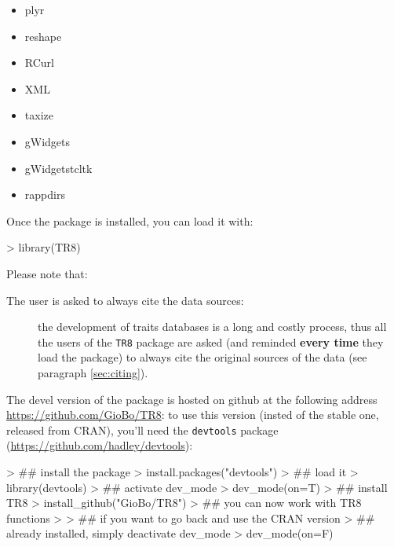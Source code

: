 \documentclass{article}
\begin{document}
 \begin{itemize}
  \item plyr\cite{plyr}
  \item reshape\cite{reshape}
  \item RCurl\cite{RCurl}
  \item XML\cite{XML}
  \item taxize\cite{taxize}
  \item gWidgets\cite{gWidgets}
  \item gWidgetstcltk
  \item rappdirs
  \end{itemize}
  

  
  Once the package is installed, you can load it with:

\begin{Schunk}
\begin{Sinput}
> library(TR8)
\end{Sinput}
\end{Schunk}

Please note that:

\begin{description}
\item[The user is asked to always cite the data sources: ] the
  development of traits databases is a long and costly process,
  thus all the users of the \texttt{TR8} package are asked (and
  reminded \textbf{every time} they load the package) to always cite the original sources of the data (see
  paragraph \ref{sec:citing}).
  
\end{description}

  The devel version of the package is hosted on github at the
  following address \url{https://github.com/GioBo/TR8}: to use this
  version (insted of the stable one, released from CRAN), you'll need
  the \texttt{devtools} package (\url{https://github.com/hadley/devtools}):
  
\begin{Schunk}
\begin{Sinput}
> ## install the package
> install.packages("devtools")
> ## load it
> library(devtools)
> ## activate dev_mode
> dev_mode(on=T)
> ## install TR8
> install_github("GioBo/TR8")
> ## you can now work with TR8 functions
> 
> ## if you want to go back and use the CRAN version
> ## already installed, simply deactivate dev_mode
> dev_mode(on=F)
\end{Sinput}
\end{Schunk}
  
\end{document}

